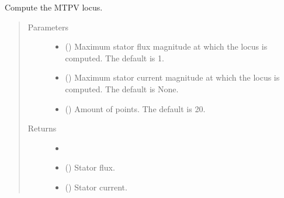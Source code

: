 \documentclass[letterpaper,10pt,english]{sphinxmanual}
\begin{document}
\begin{fulllineitems}
\begin{fulllineitems}
\label{\detokenize{control.sm:control.sm.torque.TorqueCharacteristics.mtpv_locus}}
\pysigstartsignatures
{}
\pysigstopsignatures
\sphinxAtStartPar
Compute the MTPV locus.
\begin{quote}\begin{description}
\item[{Parameters}] \leavevmode\begin{itemize}
\item {} 
\sphinxAtStartPar
{} (\sphinxstyleliteralemphasis{\sphinxupquote{, }}) \textendash{} Maximum stator flux magnitude at which the locus is computed. The
default is 1.

\item {} 
\sphinxAtStartPar
{} (\sphinxstyleliteralemphasis{\sphinxupquote{, }}) \textendash{} Maximum stator current magnitude at which the locus is computed.
The default is None.

\item {} 
\sphinxAtStartPar
{} (\sphinxstyleliteralemphasis{\sphinxupquote{, }}) \textendash{} Amount of points. The default is 20.

\end{itemize}

\item[{Returns}] \leavevmode
\sphinxAtStartPar
\begin{itemize}
\item {} 
\sphinxAtStartPar
{}

\item {} 
\sphinxAtStartPar
{} () \textendash{} Stator flux.

\item {} 
\sphinxAtStartPar
{} () \textendash{} Stator current.


\end{itemize}
\end{description}
\end{quote}
\end{fulllineitems}
\end{fulllineitems}
\end{document}
